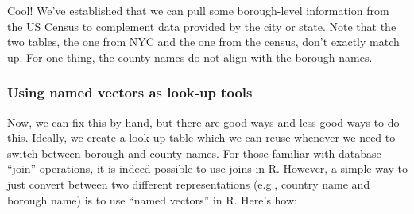 \documentclass[openany]{book}
\newenvironment{Shaded}{\begin{snugshade}}{\end{snugshade}}
\newcommand{\CommentTok}[1]{\textcolor[rgb]{0.56,0.35,0.01}{\textit{#1}}}
\newcommand{\DataTypeTok}[1]{\textcolor[rgb]{0.13,0.29,0.53}{#1}}
\newcommand{\DecValTok}[1]{\textcolor[rgb]{0.00,0.00,0.81}{#1}}
\newcommand{\KeywordTok}[1]{\textcolor[rgb]{0.13,0.29,0.53}{\textbf{#1}}}
\newcommand{\NormalTok}[1]{#1}
\newcommand{\OperatorTok}[1]{\textcolor[rgb]{0.81,0.36,0.00}{\textbf{#1}}}
\newcommand{\OtherTok}[1]{\textcolor[rgb]{0.56,0.35,0.01}{#1}}
\newcommand{\StringTok}[1]{\textcolor[rgb]{0.31,0.60,0.02}{#1}}
\begin{document}
Cool! We've established that we can pull some borough-level information from the US Census to complement data provided by the city or state. Note that the two tables, the one from NYC and the one from the census, don't exactly match up. For one thing, the county names do not align with the borough names.

\hypertarget{using-named-vectors-as-look-up-tools}{%
\subsubsection*{Using named vectors as look-up tools}\label{using-named-vectors-as-look-up-tools}}

Now, we can fix this by hand, but there are good ways and less good ways to do this. Ideally, we create a look-up table which we can reuse whenever we need to switch between borough and county names. For those familiar with database ``join'' operations, it is indeed possible to use joins in R. However, a simple way to just convert between two different representations (e.g., country name and borough name) is to use ``named vectors'' in R. Here's how:

\begin{Shaded}
\end{Shaded}
\end{document}
